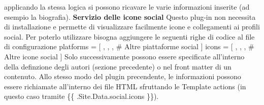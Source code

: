 \documentclass[target=bach,aauheader=]{thud}
\begin{document}
applicando la stessa logica si possono ricavare le varie informazioni inserite (ad esempio la biografia).
\newline
\newline
\textbf{{\fontsize{12}{14}\selectfont Servizio delle icone social}}
\newline \newline
Questo plug-in non necessita di installazione e permette di visualizzare facilmente icone e collegamenti ai profili social. Per poterlo utilizzare bisogna aggiungere le seguenti righe di codice al file di configurazione 
\newline \newline [social]
\newline platforms = [
,
,
,
\newline    \# Altre piattaforme social
\newline ]
\newline
\newline icons = [
,
,
,
\newline    \# Altre icone social
\newline ]
\newline \newline
Solo successivamente possono essere specificate all'interno della definzione degli autori (sezione precedente) o nel front matter di un contenuto.
Allo stesso modo del plugin precendente, le informazioni possono essere richiamate all'interno dei file HTML sfruttando le Template actions (in questo caso tramite \{\{ .Site.Data.social.icons \}\}).
\end{document}

